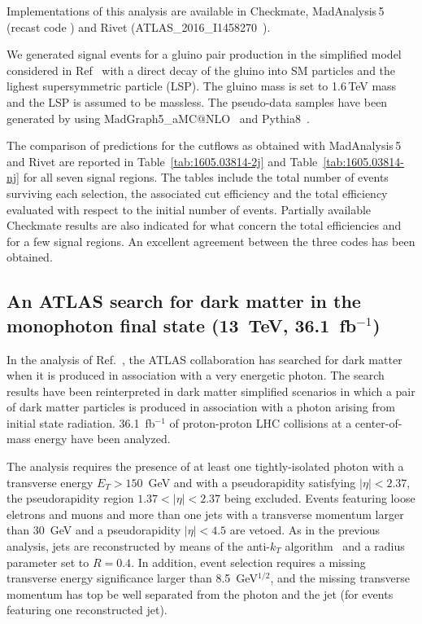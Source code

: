 \documentclass[11pt]{cernrep}
\begin{document}
Implementations of this analysis are available in Checkmate, MadAnalysis\,5 (recast code \cite{ma5-multijet}) 
and Rivet (ATLAS\_2016\_I1458270~\cite{rivet-multijet}). 

We generated signal events for a gluino pair production in the simplified model considered in Ref~\cite{Aaboud:2016zdn} with a direct decay of the gluino into SM particles and the lighest supersymmetric particle (LSP). The gluino mass is set to 1.6$\,$TeV mass and the LSP is assumed to be massless. The pseudo-data samples have been generated by using MadGraph5\_aMC@NLO~\cite{Alwall:2014hca} and Pythia8~\cite{Sjostrand:2014zea}.

The comparison of
predictions for the cutflows as obtained with MadAnalysis\,5  and Rivet are
reported in Table~\ref{tab:1605.03814-2j} and Table~\ref{tab:1605.03814-nj} for
all seven signal regions.  The tables include the total number of events
surviving each selection, the associated cut efficiency and the total efficiency
evaluated with respect to the initial number of events. Partially available
Checkmate results are also indicated for what concern the total efficiencies and
for a few signal regions.
An excellent agreement between the three codes has been obtained.





\subsection{An ATLAS search for dark matter in the monophoton final state
  (13~TeV,  36.1~fb$^{-1}$)}

In the analysis of Ref.~\cite{Aaboud:2017dor}, the ATLAS collaboration has
searched for dark matter when it is produced in association with a very
energetic photon. The search results have been reinterpreted in dark matter
simplified scenarios in which a pair of dark matter particles is produced in
association with a photon arising from initial state radiation. 36.1~fb$^{-1}$
of proton-proton LHC collisions at a center-of-mass energy have been analyzed.

The analysis requires the presence of at least one tightly-isolated photon with
a transverse energy $E_T > 150$~GeV and with a pseudorapidity satisfying
$|\eta| < 2.37$, the pseudorapidity region $1.37 < |\eta| < 2.37$ being
excluded. Events featuring loose eletrons and muons and more than one jets with
a transverse momentum larger than 30~GeV and a pseudorapidity $|\eta|<4.5$ are
vetoed. As in the previous analysis, jets are reconstructed by means of the
anti-$k_T$ algorithm~\cite{Cacciari:2008gp}  and a radius parameter set to
$R=0.4$. In addition, event selection requires a missing transverse energy
significance larger than 8.5~GeV$^{1/2}$, and the missing transverse momentum
has top be well separated from the photon and the jet (for events featuring one
reconstructed jet).
\end{document}

